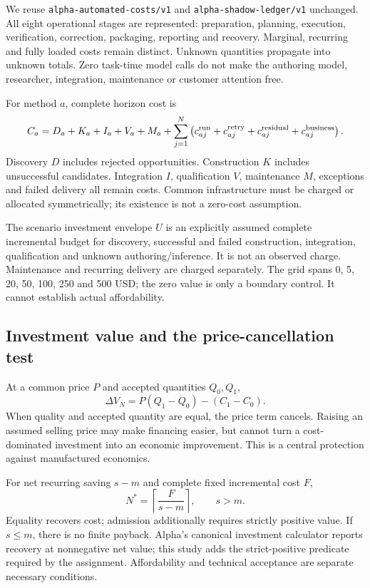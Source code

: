 \documentclass[11pt,a4paper]{article}
\newcommand{\code}[1]{\texttt{#1}}
\begin{document}
We reuse \code{alpha-automated-costs/v1} and \code{alpha-shadow-ledger/v1}
unchanged. All eight operational stages are represented: preparation, planning,
execution, verification, correction, packaging, reporting and recovery. Marginal,
recurring and fully loaded costs remain distinct. Unknown quantities propagate
into unknown totals. Zero task-time model calls do not make the authoring model,
researcher, integration, maintenance or customer attention free.

For method $a$, complete horizon cost is
\[
C_a=D_a+K_a+I_a+V_a+M_a+
\sum_{j=1}^{N}\left(c^{\rm run}_{aj}+c^{\rm retry}_{aj}
+c^{\rm residual}_{aj}+c^{\rm business}_{aj}\right).
\]
Discovery $D$ includes rejected opportunities. Construction $K$ includes
unsuccessful candidates. Integration $I$, qualification $V$, maintenance $M$,
exceptions and failed delivery all remain costs. Common infrastructure must be
charged or allocated symmetrically; its existence is not a zero-cost assumption.

The scenario investment envelope $U$ is an explicitly assumed complete incremental
budget for discovery, successful and failed construction, integration,
qualification and unknown authoring/inference. It is not an observed charge.
Maintenance and recurring delivery are charged separately. The grid spans
0, 5, 20, 50, 100, 250 and 500 USD; the zero value is only a boundary control.
It cannot establish actual affordability.

\subsection{Investment value and the price-cancellation test}
At a common price $P$ and accepted quantities $Q_0,Q_1$,
\[
\Delta V_N=P(Q_1-Q_0)-(C_1-C_0).
\]
When quality and accepted quantity are equal, the price term cancels. Raising an
assumed selling price may make financing easier, but cannot turn a cost-dominated
investment into an economic improvement. This is a central protection against
manufactured economics.

For net recurring saving $s-m$ and complete fixed incremental cost $F$,
\[
N^*=\left\lceil\frac{F}{s-m}\right\rceil,\qquad s>m.
\]
Equality recovers cost; admission additionally requires strictly positive value.
If $s\leq m$, there is no finite payback. Alpha's canonical investment calculator
reports recovery at nonnegative net value; this study adds the strict-positive
predicate required by the assignment. Affordability and technical acceptance are
separate necessary conditions.
\end{document}
